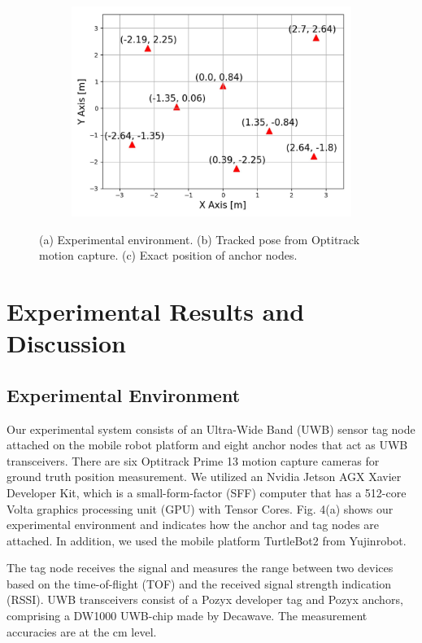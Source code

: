 \documentclass[letterpaper, 10 pt, conference]{ieeeconf}
\begin{document}
\begin{figure}[h]
	\begin{subfigure}[b]{0.32\textwidth}
		\includegraphics[width=\textwidth]{image/system_exact_position}
		\caption{}
		\label{fig:Exact_position}
	\end{subfigure}
	\caption{(a) Experimental environment. (b) Tracked pose from Optitrack motion capture. (c) Exact position of anchor nodes. }\label{fig:experimental_envorinment}
\end{figure}

\section{Experimental Results and Discussion}
\subsection{Experimental Environment}

Our experimental system consists of an Ultra-Wide Band (UWB) sensor tag node attached on the mobile robot platform and eight anchor nodes that act as UWB transceivers. There are six Optitrack Prime 13 motion capture cameras for ground truth position measurement. We utilized an Nvidia Jetson AGX Xavier Developer Kit\cite{xavier2018}, which is a small-form-factor (SFF) computer that has a 512-core Volta graphics processing unit (GPU) with Tensor Cores. Fig. 4(a)
 shows our experimental environment and indicates how the anchor and tag nodes are attached. In addition, we used the mobile platform TurtleBot2 from Yujinrobot\cite{turtlebot22013}.

The tag node receives the signal and measures the range between two devices based on the time-of-flight (TOF) and the received signal strength indication (RSSI). UWB transceivers consist of a Pozyx developer tag and Pozyx anchors\cite{pozyx2018}, comprising a DW1000 UWB-chip made by Decawave. The measurement accuracies are at the cm level.
 
\end{document}
